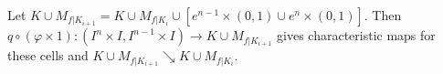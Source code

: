 Let $K \cup M_{f|K_{i+1}} = K \cup M_{f|K_i} \cup [e^{n-1} \times (0,1) \cup e^n \times (0,1)]$. Then $q \circ (\varphi \times 1): (I^n \times I, I^{n-1} \times I) \to K \cup M_{f|K_{i+1}}$ gives characteristic maps for these cells and $K \cup M_{f|K_{i+1}} \searrow K \cup M_{f|K_i}$.
